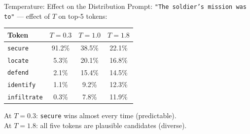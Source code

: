 \documentclass{beamer}
\begin{document}
\begin{frame}{Temperature: Effect on the Distribution}
    \centering
    \small
    Prompt: \texttt{"The soldier's mission was to"} --- effect of $T$ on top-5 tokens:

    \vspace{0.2cm}
    \begin{tabular}{@{}lccc@{}}
        \toprule
        \textbf{Token} & \textbf{$T=0.3$} & \textbf{$T=1.0$} & \textbf{$T=1.8$} \\ \midrule
        \texttt{secure}    & 91.2\% & 38.5\% & 22.1\% \\
        \texttt{locate}    &  5.3\% & 20.1\% & 16.8\% \\
        \texttt{defend}    &  2.1\% & 15.4\% & 14.5\% \\
        \texttt{identify}  &  1.1\% &  9.2\% & 12.3\% \\
        \texttt{infiltrate}&  0.3\% &  7.8\% & 11.9\% \\ \bottomrule
    \end{tabular}

    \vspace{0.3cm}
    At $T=0.3$: \texttt{secure} wins almost every time (predictable). \\
    At $T=1.8$: all five tokens are plausible candidates (diverse).
\end{frame}
\end{document}
